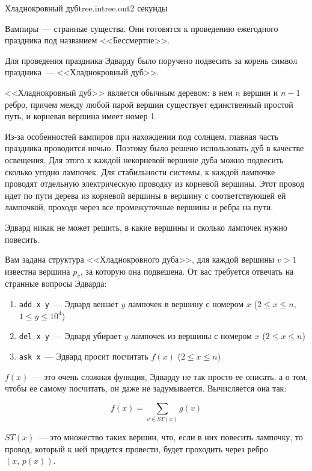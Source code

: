 \begin{problem}{Хладнокровный дуб}{tree.in}{tree.out}{2 секунды}{}


Вампиры~--- странные существа. Они готовятся к проведению ежегодного праздника под названием <<Бессмертие>>. 

Для проведения праздника Эдварду было поручено подвесить за корень символ праздника~--- <<Хладнокровный дуб>>.

<<Хладнокровный дуб>> является обычным деревом: в нем $n$ вершин и $n - 1$ ребро, причем между любой парой 
вершин существует единственный простой путь, и корневая вершина имеет номер 1.

Из-за особенностей вампиров при нахождении под солнцем, главная часть праздника проводится ночью. Поэтому было 
решено использовать дуб в качестве освещения.
Для этого к каждой некорневой вершине дуба можно подвесить сколько угодно лампочек.
Для стабильности системы, к каждой лампочке проводят отдельную электрическую проводку из корневой вершины. 
Этот провод идет по пути дерева из корневой вершины
в вершину с соответствующей ей лампочкой, проходя через все промежуточные вершины и ребра на пути.

Эдвард никак не может решить, в какие вершины и сколько лампочек нужно повесить.

Вам задана структура <<Хладнокровного дуба>>, для каждой вершины $v > 1$ известна вершина $p_v$, за которую она подвешена. 
От вас требуется отвечать на странные вопросы Эдварда:
\begin{enumerate}
\item \texttt{add x y}~--- Эдвард вешает $y$ лампочек в вершину с номером $x$ ($2 \le x \le n$, $1 \le y \le 10^4$)
\item \texttt{del x y}~--- Эдвард убирает $y$ лампочек из вершины с номером $x$ ($2 \le x \le n$)
\item \texttt{ask x}~--- Эдвард просит посчитать $f(x)$ ($2 \le x \le n$)
\end{enumerate}

$f(x)$~--- это очень сложная функция, Эдварду не так просто ее описать, а о том, 
чтобы ее самому посчитать, он даже не задумывается. Вычисляется она так:

$$f(x) = \sum\limits_{v \in ST(x)}g(v)$$

$ST(x)$~--- это множество таких вершин, что, если в них повесить лампочку, то провод, который к ней придется провести,
будет проходить через ребро $(x,\,p(x))$. 


\end{problem}
